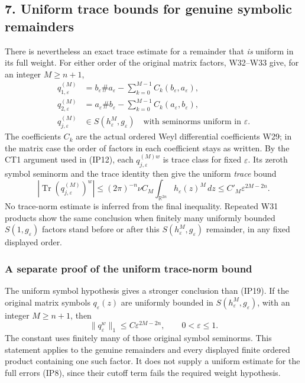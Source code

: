 \documentclass[
  11pt,
]{article}
\begin{document}
\subsection{7. Uniform trace bounds for genuine symbolic
remainders}\label{uniform-trace-bounds-for-genuine-symbolic-remainders}

There is nevertheless an exact trace estimate for a remainder that
\emph{is} uniform in its full weight. For either order of the original
matrix factors, W32--W33 give, for an integer \(M\ge n+1\), \[
 \begin{split}
 q_{1,\varepsilon}^{(M)}
   &=b_\varepsilon\#a_\varepsilon
       -\sum_{k=0}^{M-1}C_k(b_\varepsilon,a_\varepsilon),\\
 q_{2,\varepsilon}^{(M)}
   &=a_\varepsilon\#b_\varepsilon
       -\sum_{k=0}^{M-1}C_k(a_\varepsilon,b_\varepsilon),\\
 q_{j,\varepsilon}^{(M)}
   &\in S(h_\varepsilon^M,g_\varepsilon)
       \quad\text{with seminorms uniform in }\varepsilon.
 \end{split}
 \tag{IP18}
\] The coefficients \(C_k\) are the actual ordered Weyl differential
coefficients W29; in the matrix case the order of factors in each
coefficient stays as written. By the CT1 argument used in (IP12), each
\(q_{j,\varepsilon}^{(M)w}\) is trace class for fixed \(\varepsilon\).
Its zeroth symbol seminorm and the trace identity then give the uniform
\emph{trace} bound \[
 \left|\operatorname{Tr}(q_{j,\varepsilon}^{(M)})^w\right|
 \le(2\pi)^{-n}\nu C_M
       \int_{\mathbb R^{2n}}h_\varepsilon(z)^M\,dz
 \le C'_M\varepsilon^{2M-2n}.
 \tag{IP19}
\] No trace-norm estimate is inferred from the final inequality.
Repeated W31 products show the same conclusion when finitely many
uniformly bounded \(S(1,g_\varepsilon)\) factors stand before or after
this \(S(h_\varepsilon^M,g_\varepsilon)\) remainder, in any fixed
displayed order.

\subsubsection{A separate proof of the uniform trace-norm
bound}\label{a-separate-proof-of-the-uniform-trace-norm-bound}

The uniform symbol hypothesis gives a stronger conclusion than (IP19).
If the original matrix symbols \(q_\varepsilon(z)\) are uniformly
bounded in \(S(h_\varepsilon^M,g_\varepsilon)\), with an integer
\(M\geq n+1\), then \[
 \|q_\varepsilon^w\|_1\leq C\varepsilon^{2M-2n},
                       \qquad 0<\varepsilon\leq1.              \tag{IP22}
\] The constant uses finitely many of those original symbol seminorms.
This statement applies to the genuine remainders and every displayed
finite ordered product containing one such factor. It does not supply a
uniform estimate for the full errors (IP8), since their cutoff term
fails the required weight hypothesis.
\end{document}
